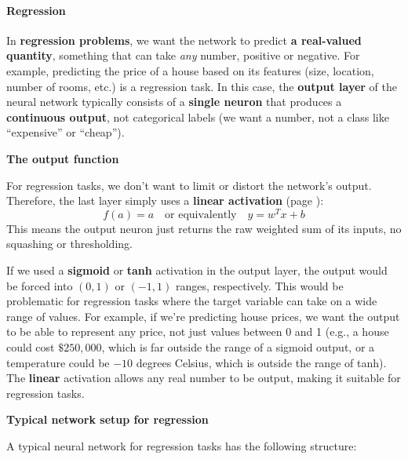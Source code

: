 \newpage

\paragraph{Regression}

In \textbf{regression problems}, we want the network to predict \textbf{a real-valued quantity}, something that can take \emph{any} number, positive or negative. For example, predicting the price of a house based on its features (size, location, number of rooms, etc.) is a regression task. In this case, the \textbf{output layer} of the neural network typically consists of a \textbf{single neuron} that produces a \textbf{continuous output}, not categorical labels (we want a number, not a class like ``expensive'' or ``cheap'').

\highspace
\begin{flushleft}
    \textcolor{Green3}{ \textbf{The output function}}
\end{flushleft}
For regression tasks, we don't want to limit or distort the network's output. Therefore, the last layer simply uses a \textbf{linear activation} (page \pageref{par:linear-activation-function}):
\begin{equation*}
    f(a) = a \quad \text{or equivalently} \quad y = w^{T} x + b
\end{equation*}
This means the output neuron just returns the raw weighted sum of its inputs, no squashing or thresholding.

\highspace
If we used a \textbf{sigmoid} or \textbf{tanh} activation in the output layer, the output would be forced into $\left(0,1\right)$ or $\left(-1,1\right)$ ranges, respectively. This would be problematic for regression tasks where the target variable can take on a wide range of values. For example, if we're predicting house prices, we want the output to be able to represent any price, not just values between 0 and 1 (e.g., a house could cost $\$250,000$, which is far outside the range of a sigmoid output, or a temperature could be $-10$ degrees Celsius, which is outside the range of tanh). The \textbf{linear} activation allows any real number to be output, making it suitable for regression tasks.

\highspace
\begin{flushleft}
    \textcolor{Green3}{ \textbf{Typical network setup for regression}}
\end{flushleft}
A typical neural network for regression tasks has the following structure:

